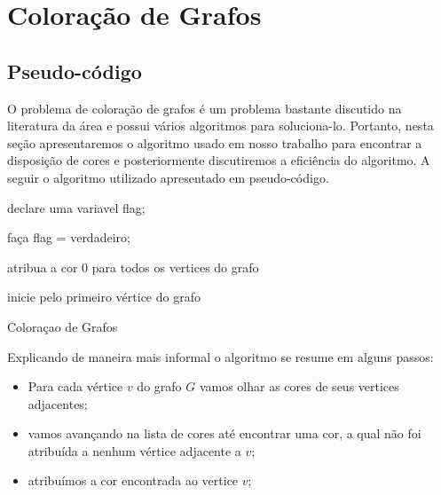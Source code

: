 \documentclass[12pt,openright,oneside,a4paper,brazil]{abntex2}
\begin{document}
\imprimircapa
\newpage
\tableofcontents

\chapter{Coloração de Grafos}

\section{Pseudo-código}

O problema de coloração de grafos é um problema bastante discutido na literatura da área e possui vários algoritmos para soluciona-lo. Portanto, nesta seção apresentaremos o algoritmo usado em nosso trabalho para encontrar a disposição de cores e posteriormente discutiremos a eficiência do algoritmo. A seguir o algoritmo utilizado apresentado em pseudo-código.\\

\begin{algorithm}[H]
\SetAlgoLined
{}
declare uma variavel flag;

faça flag = verdadeiro;

atribua a cor 0 para todos os vertices do grafo\;

inicie pelo primeiro vértice do grafo\; 

\caption{Coloraçao de Grafos}
\end{algorithm}

Explicando de maneira mais informal o algoritmo se resume em alguns passos:
\begin{itemize}
	\item Para cada vértice $v$ do grafo $G$ vamos olhar as cores de seus vertices adjacentes;
	\item vamos avançando na lista de cores até encontrar uma cor, a qual não foi atribuída a nenhum vértice adjacente a $v$;
	\item atribuímos a cor encontrada ao vertice $v$; 
\end{itemize}
\end{document}
